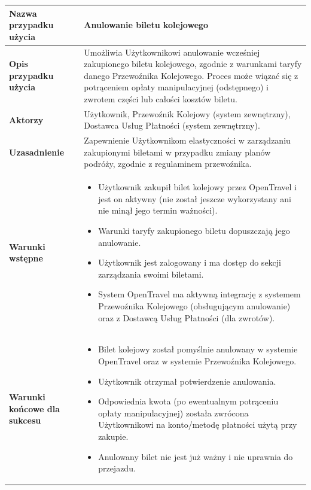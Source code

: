 \documentclass[a4paper,12pt]{article}
\begin{document}
\begin{longtable}{|p{\pierwszakolumnaszerokoscPUBKAnulowanie}|p{\drugakolumnaszerokoscPUBKAnulowanie}|}
    \textbf{Nazwa przypadku użycia} & Anulowanie biletu kolejowego \\
    \hline
    \textbf{Opis przypadku użycia} & Umożliwia Użytkownikowi anulowanie wcześniej zakupionego biletu kolejowego, zgodnie z warunkami taryfy danego Przewoźnika Kolejowego. Proces może wiązać się z potrąceniem opłaty manipulacyjnej (odstępnego) i zwrotem części lub całości kosztów biletu. \\
    \hline
    \textbf{Aktorzy} & Użytkownik, Przewoźnik Kolejowy (system zewnętrzny), Dostawca Usług Płatności (system zewnętrzny). \\
    \hline
    \textbf{Uzasadnienie} & Zapewnienie Użytkownikom elastyczności w zarządzaniu zakupionymi biletami w przypadku zmiany planów podróży, zgodnie z regulaminem przewoźnika. \\
    \hline
    \textbf{Warunki wstępne} &
        \begin{itemize} \itemsep0pt \parskip0pt \parsep0pt
            \item Użytkownik zakupił bilet kolejowy przez OpenTravel i jest on aktywny (nie został jeszcze wykorzystany ani nie minął jego termin ważności).
            \item Warunki taryfy zakupionego biletu dopuszczają jego anulowanie.
            \item Użytkownik jest zalogowany i ma dostęp do sekcji zarządzania swoimi biletami.
            \item System OpenTravel ma aktywną integrację z systemem Przewoźnika Kolejowego (obsługującym anulowanie) oraz z Dostawcą Usług Płatności (dla zwrotów).
        \end{itemize} \\
    \hline
    \textbf{Warunki końcowe dla sukcesu} &
        \begin{itemize} \itemsep0pt \parskip0pt \parsep0pt
            \item Bilet kolejowy został pomyślnie anulowany w systemie OpenTravel oraz w systemie Przewoźnika Kolejowego.
            \item Użytkownik otrzymał potwierdzenie anulowania.
            \item Odpowiednia kwota (po ewentualnym potrąceniu opłaty manipulacyjnej) została zwrócona Użytkownikowi na konto/metodę płatności użytą przy zakupie.
            \item Anulowany bilet nie jest już ważny i nie uprawnia do przejazdu.
        \end{itemize} \\

\end{longtable}
\end{document}
